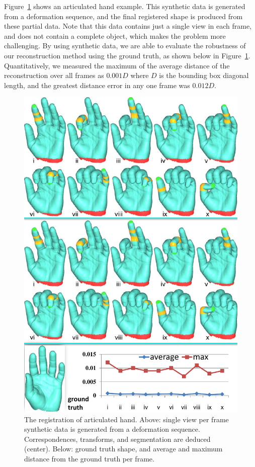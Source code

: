 Figure~\ref{fig:3DHand} shows an articulated hand example.
This synthetic data is generated from a deformation sequence, and the final registered shape is produced from these partial data. Note that this data contains just a single
view in each frame, and does not contain a complete object, which makes the problem
more challenging.
By using synthetic data, we are able to evaluate the robustness of our reconstruction method using the ground truth, as shown below in Figure~\ref{fig:3DHand}.
Quantitatively, we measured the maximum of the average distance of the reconstruction over all frames as $0.001 D$ where $D$ is the bounding box diagonal length, and
the greatest distance error in any one frame was  $0.012 D$.

\begin{figure}
\centering
  \includegraphics[width=0.99\linewidth]{figures/3DHand.pdf}
  \caption{The registration of articulated hand.
  Above: single view per frame synthetic data  is generated from a deformation sequence. Correspondences, transforms, and segmentation are deduced (center).
  Below: ground truth shape, and average and maximum distance from the ground truth per frame.}
\label{fig:3DHand}
\end{figure}

